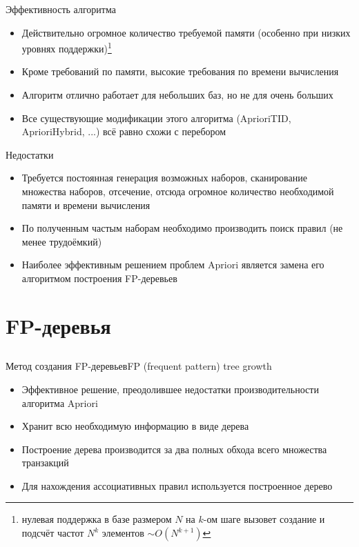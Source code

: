 \documentclass[compress,red]{beamer}
\begin{document}
\begin{frame}{Эффективность алгоритма}
\begin{itemize}
\item Действительно огромное количество требуемой памяти (особенно при низких уровнях поддержки)\footnote{нулевая поддержка в базе размером $N$ на $k$-ом шаге вызовет создание и подсчёт частот $N^k$ элементов $\sim O(N^{k+1})$}
\item Кроме требований по памяти, высокие требования по времени вычисления
\item Алгоритм отлично работает для небольших баз, но не для очень больших
\item Все существующие модификации этого алгоритма (AprioriTID, AprioriHybrid, ...) всё равно схожи с перебором

\end{itemize}
\end{frame}

\begin{frame}{Недостатки}
\begin{itemize}
	\item Требуется постоянная генерация возможных наборов, сканирование множества наборов, отсечение, отсюда огромное количество необходимой памяти и времени вычисления
	\item По полученным частым наборам необходимо производить поиск правил (не менее трудоёмкий)
	\item Наиболее эффективным решением проблем Apriori является замена его алгоритмом построения FP-деревьев
\end{itemize}
\end{frame}

\section{FP-деревья}
\subsection{}
\begin{frame}{Метод создания FP-деревьев}{FP (frequent pattern) tree growth}
\begin{itemize}
	\item Эффективное решение, преодолившее недостатки производительности алгоритма Apriori
	\item Хранит всю необходимую информацию в виде дерева
	\item Построение дерева производится за два полных обхода всего множества транзакций
	\item Для нахождения ассоциативных правил используется построенное дерево
\end{itemize}
\end{frame}
\end{document}
